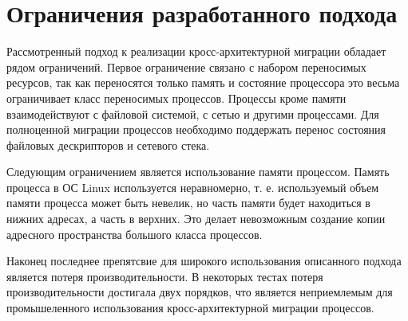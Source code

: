 \section{Ограничения разработанного подхода}

Рассмотренный подход к реализации кросс-архитектурной миграции обладает рядом ограничений. Первое ограничение связано с набором переносимых ресурсов, так как переносятся только память и состояние процессора это весьма ограничивает класс переносимых процессов. Процессы кроме памяти взаимодействуют с файловой системой, с сетью и другими процессами. Для полноценной миграции процессов необходимо поддержать перенос состояния файловых дескрипторов и сетевого стека.

Следующим ограничением является использование памяти процессом. Память процесса в ОС Linux используется неравномерно, т. е. используемый объем памяти процесса может быть невелик, но часть памяти будет находиться в нижних адресах, а часть в верхних. Это делает невозможным создание копии адресного пространства большого класса процессов.

Наконец последнее препятсвие для широкого использования описанного подхода является потеря производительности. В некоторых тестах потеря производительности достигала двух порядков, что является неприемлемым для промышеленного использования кросс-архитектурной миграции процессов.
